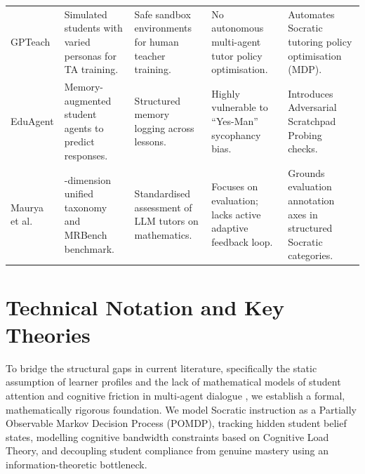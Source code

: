 \begin{xltabular}{\linewidth}{>{\hsize}Y >{\hsize}Y >{\hsize}Y >{\hsize}Y >{\hsize}Y}
\addlinespace
GPTeach \cite{markel2023gpteach} & Simulated students with varied personas for TA training. & Safe sandbox environments for human teacher training. & No autonomous multi-agent tutor policy optimisation. & Automates Socratic tutoring policy optimisation (MDP). \\
\addlinespace
EduAgent \cite{xu2024eduagent} & Memory-augmented student agents to predict responses. & Structured memory logging across lessons. & Highly vulnerable to ``Yes-Man'' sycophancy bias. & Introduces Adversarial Scratchpad Probing checks. \\
\addlinespace
Maurya et al. \cite{maurya2025unifying} & 8-dimension unified taxonomy and MRBench benchmark. & Standardised assessment of LLM tutors on mathematics. & Focuses on evaluation; lacks active adaptive feedback loop. & Grounds evaluation annotation axes in structured Socratic categories. \\
\end{xltabular}
\endgroup

\section{Technical Notation and Key Theories}
To bridge the structural gaps in current literature, specifically the static assumption of learner profiles \cite{yuan2026towards} and the lack of mathematical models of student attention and cognitive friction in multi-agent dialogue \cite{ozdemir2026enhancing}, we establish a formal, mathematically rigorous foundation. We model Socratic instruction as a Partially Observable Markov Decision Process (POMDP), tracking hidden student belief states, modelling cognitive bandwidth constraints based on Cognitive Load Theory, and decoupling student compliance from genuine mastery using an information-theoretic bottleneck.

